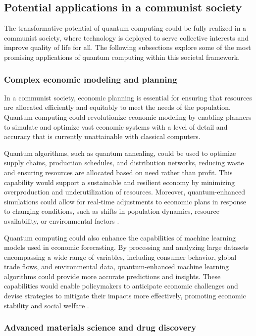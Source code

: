 \subsection{Potential applications in a communist society}

The transformative potential of quantum computing could be fully realized in a communist society, where technology is deployed to serve collective interests and improve quality of life for all. The following subsections explore some of the most promising applications of quantum computing within this societal framework.

\subsubsection{Complex economic modeling and planning}

In a communist society, economic planning is essential for ensuring that resources are allocated efficiently and equitably to meet the needs of the population. Quantum computing could revolutionize economic modeling by enabling planners to simulate and optimize vast economic systems with a level of detail and accuracy that is currently unattainable with classical computers.

Quantum algorithms, such as quantum annealing, could be used to optimize supply chains, production schedules, and distribution networks, reducing waste and ensuring resources are allocated based on need rather than profit. This capability would support a sustainable and resilient economy by minimizing overproduction and underutilization of resources. Moreover, quantum-enhanced simulations could allow for real-time adjustments to economic plans in response to changing conditions, such as shifts in population dynamics, resource availability, or environmental factors \cite[pp.~23-28]{Farhi2001}.

Quantum computing could also enhance the capabilities of machine learning models used in economic forecasting. By processing and analyzing large datasets encompassing a wide range of variables, including consumer behavior, global trade flows, and environmental data, quantum-enhanced machine learning algorithms could provide more accurate predictions and insights. These capabilities would enable policymakers to anticipate economic challenges and devise strategies to mitigate their impacts more effectively, promoting economic stability and social welfare \cite[pp.~150-155]{Harrow2009}.

\subsubsection{Advanced materials science and drug discovery}

